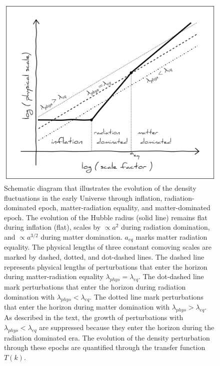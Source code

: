 \begin{figure}
\begin{center}
\includegraphics[width=\textwidth]{figs/lifo.png}
\caption{Schematic diagram that illustrates the evolution of the density 
fluctuations in the early Universe through inflation, radiation-dominated epoch, 
matter-radiation equality, and matter-dominated epoch. The evolution of the 
Hubble radius (solid line) remains flat during inflation (flat), scales by 
$\propto a^2$ during radiation domination, and $\propto a^{3/2}$ during matter
domination. $a_{eq}$ marks matter radiation equality. The physical lengths of
three constant comoving scales are marked by dashed, dotted, and dot-dashed
lines. The dashed line represents physical lengths of perturbations 
that enter the horizon during matter-radiation equality $\lambda_{phys}=\lambda_{eq}$. 
The dot-dashed line mark perturbations that enter the horizon during radiation 
domination with $\lambda_{phys} < \lambda_{eq}$.  The dotted line mark 
perturbations that enter the horizon during matter domination with 
$\lambda_{phys} > \lambda_{eq}$. As described in the text, the growth of perturbations 
with $\lambda_{phys} < \lambda_{eq}$ are suppressed because they enter the 
horizon during the radiation dominated era. The evolution of the density 
perturbation through these epochs are quantified through the transfer function $T(k)$.} 
\label{fig:lifo}
\end{center}
\end{figure}


